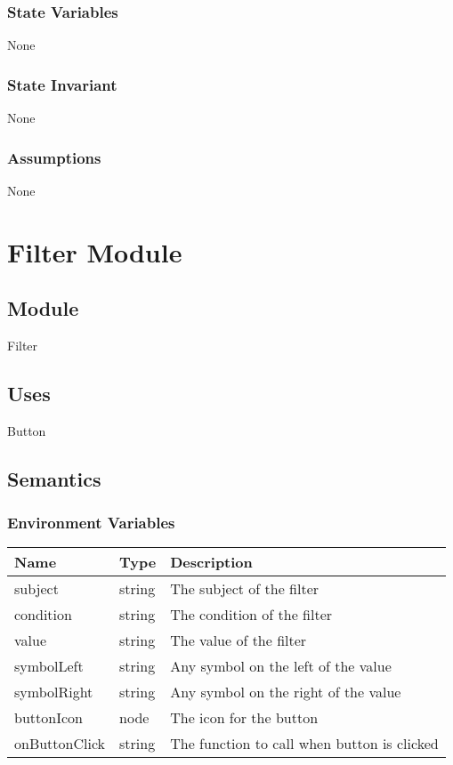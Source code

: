 \documentclass[12pt]{article}
\begin{document}
\subsubsection{State Variables}
None

\subsubsection{State Invariant}
None

\subsubsection{Assumptions}
None

\newpage

\section{Filter Module}

\subsection{Module}
Filter

\subsection{Uses}
Button

\subsection{Semantics}

\subsubsection{Environment Variables}
\begin{tabular}{| l | l | p{10cm} |}
    \hline
    \textbf{Name} & \textbf{Type} & \textbf{Description}\\ \hline
    subject & string & The subject of the filter\\ \hline
    condition & string & The condition of the filter\\ \hline
    value & string & The value of the filter\\ \hline
    symbolLeft & string & Any symbol on the left of the value\\ \hline
    symbolRight & string & Any symbol on the right of the value\\ \hline
    buttonIcon & node & The icon for the button\\ \hline
    onButtonClick & string & The function to call when button is clicked\\ \hline
\end{tabular}
\end{document}
